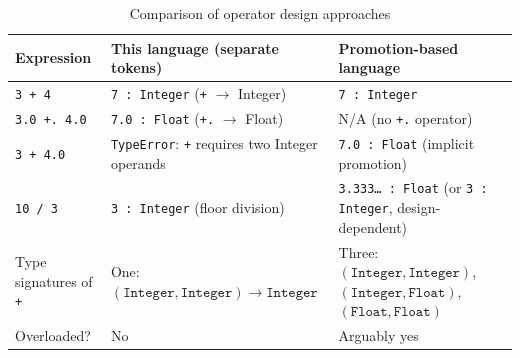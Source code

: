 \begin{table}[H]
\centering
\caption{Comparison of operator design approaches}
\label{tab:operator-design-comparison}
\small
\begin{tabular}{p{3.2cm}p{4.8cm}p{4.8cm}}
\toprule
\textbf{Expression} & \textbf{This language (separate tokens)} & \textbf{Promotion-based language} \\
\midrule
\texttt{3 + 4}
  & \texttt{7 : Integer} (\texttt{+} $\rightarrow$ Integer)
  & \texttt{7 : Integer} \\
\texttt{3.0 +. 4.0}
  & \texttt{7.0 : Float} (\texttt{+.} $\rightarrow$ Float)
  & N/A (no \texttt{+.} operator) \\
\texttt{3 + 4.0}
  & \texttt{TypeError}: \texttt{+} requires two Integer operands
  & \texttt{7.0 : Float} (implicit promotion) \\
\texttt{10 / 3}
  & \texttt{3 : Integer} (floor division)
  & \texttt{3.333\ldots{} : Float} (or \texttt{3 : Integer}, design-dependent) \\
Type signatures of \texttt{+}
	& One: $(\texttt{Integer},\texttt{Integer}) \rightarrow \texttt{Integer}$
	& Three: $(\texttt{Integer},\texttt{Integer})$, $(\texttt{Integer},\texttt{Float})$, $(\texttt{Float},\texttt{Float})$ \\
Overloaded?
  & No
  & Arguably yes \\
\bottomrule
\end{tabular}
\end{table}
